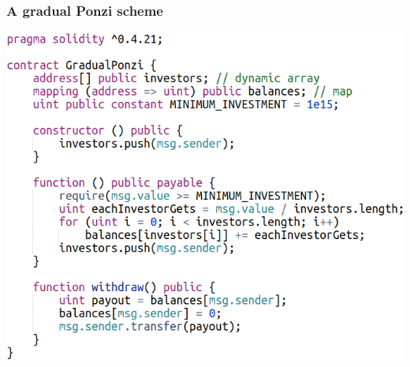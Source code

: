 \documentclass[11pt]{beamer}  %
\begin{document}
\begin{frame}\frametitle{A gradual Ponzi scheme}

  \begin{center}
    \includegraphics[scale=0.4,clip=false]{pictures/gradual-ponzi.png}
  \end{center}

\end{frame}
\end{document}

